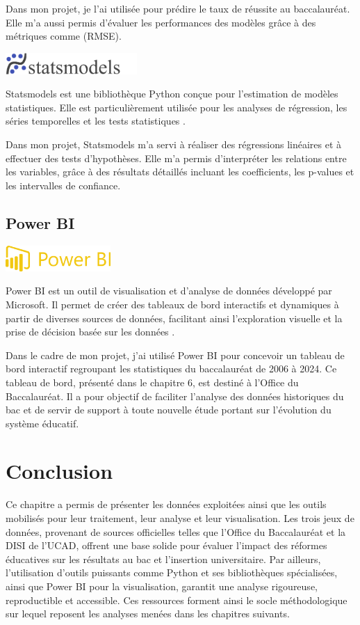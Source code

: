 Dans mon projet, je l’ai utilisée pour prédire le taux de réussite au baccalauréat. 
Elle m’a aussi permis d’évaluer les performances des modèles grâce à des métriques comme (RMSE).

\includegraphics[width=5cm]{images/statsmodes.png}

Statsmodels est une bibliothèque Python conçue pour l’estimation de modèles statistiques. 
Elle est particulièrement utilisée pour les analyses de régression, les séries temporelles et les tests statistiques \cite{statsmodels}.

Dans mon projet, Statsmodels m’a servi à réaliser des régressions linéaires et à effectuer des tests d’hypothèses. 
Elle m’a permis d’interpréter les relations entre les variables, grâce à des résultats détaillés incluant les coefficients, 
les p-values et les intervalles de confiance.

\subsection{Power BI}

\includegraphics[width=4cm]{images/powerbi.png}

Power BI est un outil de visualisation et d’analyse de données développé par Microsoft. 
Il permet de créer des tableaux de bord interactifs et dynamiques à partir de diverses sources de données, 
facilitant ainsi l'exploration visuelle et la prise de décision basée sur les données \cite{powerBI}.

Dans le cadre de mon projet, j’ai utilisé Power BI pour concevoir un tableau de bord interactif regroupant les statistiques du baccalauréat de 2006 à 2024. 
Ce tableau de bord, présenté dans le chapitre 6, est destiné à l’Office du Baccalauréat. Il a pour objectif de faciliter l’analyse des données historiques du bac et de servir de support à toute nouvelle étude portant sur l’évolution du système éducatif.


\section{Conclusion}

Ce chapitre a permis de présenter les données exploitées ainsi que les outils mobilisés pour leur traitement, leur analyse et leur visualisation. 
Les trois jeux de données, provenant de sources officielles telles que l’Office du Baccalauréat et la DISI de l’UCAD, 
offrent une base solide pour évaluer l’impact des réformes éducatives sur les résultats au bac et l’insertion universitaire. 
Par ailleurs, l’utilisation d’outils puissants comme Python et ses bibliothèques spécialisées, ainsi que Power BI pour la visualisation, 
garantit une analyse rigoureuse, reproductible et accessible. Ces ressources forment ainsi le socle méthodologique sur lequel reposent les analyses menées dans les chapitres suivants.